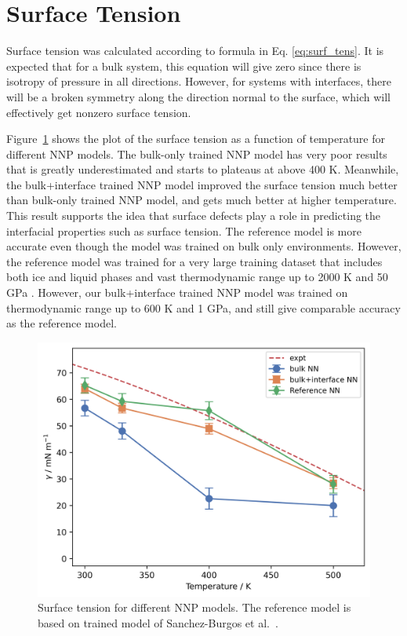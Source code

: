 \section{Surface Tension}
Surface tension was calculated according to formula in Eq.
\eqref{eq:surf_tens}. It is expected that for a bulk system, this equation will
give zero since there is isotropy of pressure in all directions. However, for
systems with interfaces, there will be a broken symmetry along the direction
normal to the surface, which will effectively get nonzero surface tension.

Figure~\ref{fig:surf_tens} shows the plot of the surface
tension as a function of temperature for different NNP models. The bulk-only
trained NNP model has very poor results that is greatly underestimated and
starts to plateaus at above 400 K. Meanwhile, the bulk+interface trained NNP
model
improved the surface
tension much better than  bulk-only trained NNP model, and gets much better at
higher
temperature. This result supports the idea that surface defects play a role in
predicting
the interfacial properties such as surface tension. The reference
model is more accurate even though the model was trained on  bulk only
environments. However, the reference model was trained for a very large
training dataset that includes both ice and liquid phases and vast
thermodynamic range up to 2000 K and 50 GPa \cite{zhang2021phase}. However, our
bulk+interface trained NNP model was trained on thermodynamic range up to 600 K
and 1 GPa, and still give comparable accuracy as the reference model.

\begin{figure}[h!]
	\centering
	\includegraphics[width=0.7\linewidth]{images/surface_tension.png}
	\caption{Surface tension for different NNP models. The
		reference model is based on trained model of Sanchez-Burgos et
		al.~\cite{sanchez2023deep}.  }
	\label{fig:surf_tens}
\end{figure}

